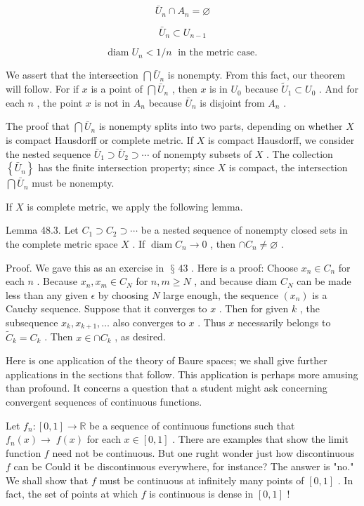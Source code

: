 \documentclass[10pt]{article}
\begin{document}
\[
{\bar{U}}_{n} \cap  {A}_{n} = \varnothing
\]

\[
{\bar{U}}_{n} \subset  {U}_{n - 1}
\]

\[
\operatorname{diam}{U}_{n} < 1/n\;\text{ in the metric case. }
\]

We assert that the intersection \(\bigcap {\bar{U}}_{n}\) is nonempty. From this fact, our theorem will follow. For if \(x\) is a point of \(\bigcap {\bar{U}}_{n}\) , then \(x\) is in \({U}_{0}\) because \({\widetilde{U}}_{1} \subset  {U}_{0}\) . And for each \(n\) , the point \(x\) is not in \({A}_{n}\) because \({\bar{U}}_{n}\) is disjoint from \({A}_{n}\) .

The proof that \(\bigcap {\bar{U}}_{n}\) is nonempty splits into two parts, depending on whether \(X\) is compact Hausdorff or complete metric. If \(X\) is compact Hausdorff, we consider the nested sequence \({\bar{U}}_{1} \supset  {\bar{U}}_{2} \supset  \cdots\) of nonempty subsets of \(X\) . The collection \(\left\{  {\bar{U}}_{n}\right\}\) has the finite intersection property; since \(X\) is compact, the intersection \(\bigcap {\bar{U}}_{n}\) must be nonempty.

If \(X\) is complete metric, we apply the following lemma.

Lemma 48.3. Let \({C}_{1} \supset  {C}_{2} \supset  \cdots\) be a nested sequence of nonempty closed sets in the complete metric space \(X\) . If \(\operatorname{diam}{C}_{n} \rightarrow  0\) , then \(\cap  {C}_{n} \neq  \varnothing\) .

Proof. We gave this as an exercise in \(\text{ § }{43}\) . Here is a proof: Choose \({x}_{n} \in  {C}_{n}\) for each \(n\) . Because \({x}_{n},{x}_{m} \in  {C}_{N}\) for \(n,m \geq  N\) , and because diam \({C}_{N}\) can be made less than any given \(\epsilon\) by choosing \(N\) large enough, the sequence \(\left( {x}_{n}\right)\) is a Cauchy sequence. Suppose that it converges to \(x\) . Then for given \(k\) , the subsequence \({x}_{k},{x}_{k + 1},\ldots\) also converges to \(x\) . Thus \(x\) necessarily belongs to \({\widetilde{C}}_{k} = {C}_{k}\) . Then \(x \in   \cap  {C}_{k}\) , as desired.

Here is one application of the theory of Baure spaces; we shall give further applications in the sections that follow. This application is perhaps more amusing than profound. It concerns a question that a student might ask concerning convergent sequences of continuous functions.

Let \({f}_{n} : \left\lbrack  {0,1}\right\rbrack   \rightarrow  \mathbb{R}\) be a sequence of continuous functions such that \({f}_{n}\left( x\right)  \rightarrow \; f\left( x\right)\) for each \(x \in  \left\lbrack  {0,1}\right\rbrack\) . There are examples that show the limit function \(f\) need not be continuous. But one rught wonder just how discontinuous \(f\) can be Could it be discontinuous everywhere, for instance? The answer is "no." We shall show that \(f\) must be continuous at infinitely many points of \(\left\lbrack  {0,1}\right\rbrack\) . In fact, the set of points at which \(f\) is continuous is dense in \(\left\lbrack  {0,1}\right\rbrack\) !
\end{document}
